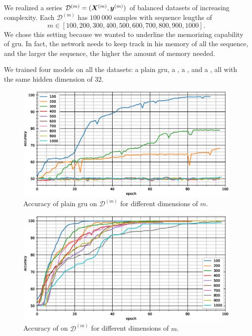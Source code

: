 We realized a series
$\mathcal{D}^{(m)}=(\bm{X}^{(m)},\bm{y}^{(m)})$ of balanced
datasets of increasing complexity. Each $\mathcal{D}^{(m)}$ has $100\ 000$
samples with 
sequence lengths of
$$
m\in[100,200,300,400,500,600,700,800,900,1000].$$
We chose this setting because we wanted to underline the memorizing
capability of \ac{gru}. In fact, the network needs to keep track in
his memory of
all the sequence, and the larger the sequence, the higher the amount of
memory needed.

We trained four models on
all the datasets: a plain \ac{gru}, a
\maxp{}, a \softmax{}, and a \maxi{}, all with the same hidden dimension of $32$. 

\begin{figure}
  \centering
  \includegraphics[width=\floatwidth]{imgMax/accuracy-base.eps}
  \caption{Accuracy of plain \ac{gru} on $\mathcal{D}^{(m)}$ for different dimensions of $m$.}
  \label{fig:testAccBase}
\end{figure}

\begin{figure}
  \centering
  \includegraphics[width=\floatwidth]{imgMax/accuracy-max.eps}
  \caption{Accuracy of \maxi{} on $\mathcal{D}^{(m)}$ for different dimensions of $m$.}
  \label{fig:testAccMax}
\end{figure}

